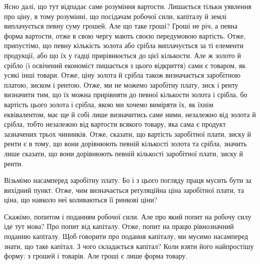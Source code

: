 Ясно далі, що тут відпадає саме розуміння вартости. Лишається тільки
уявлення про ціну, в тому розумінні, що посідачам робочої сили, капіталу
й землі виплачується певну суму грошей. Але що таке гроші? Гроші не річ,
а певна форма вартости, отже в свою чергу мають своєю передумовою вартість.
Отже, припустімо, що певну кількість золота або срібла виплачується за ті елементи
продукції, або що їх у гадці прирівнюється до цієї кількости. Але ж
золото й срібло (і освічений економіст пишається з цього відкриття) сами є
товаром, як усякі інші товари. Отже, ціну золота й срібла також визначається
заробітною платою, зиском і рентою. Отже, ми не можемо заробітну плату, зиск
і ренту визначити тим, що їх можна прирівняти до певної кількости золота
і срібла, бо вартість цього золота і срібла, якою ми хочемо виміряти їх, як їхнім
еквівалентом, має ще й собі лише визначитись саме ними, незалежно від золота
й срібла, тобто незалежно від вартости всякого товару, яка сама є продукт зазначених
трьох чинників. Отже, сказати, що вартість заробітної плати, зиску
й ренти є в тому, що вони дорівнюють певній кількості золота та срібла, значить
лише сказати, що вони дорівнюють певній кількості заробітної плати,
зиску й ренти.

Візьмімо насамперед заробітну плату. Бо і з цього погляду праця мусить
бути за вихідний пункт. Отже, чим визначається реґуляційна ціна заробітної
плати, та ціна, що навколо неї коливаються її ринкові ціни?

Скажімо, попитом і поданням робочої сили. Але про який попит на робочу
силу іде тут мова? Про попит від капіталу. Отже, попит на працю рівнозначний
поданню капіталу. Щоб говорити про подання капіталу, ми мусимо
насамперед знати, що таке капітал. З чого складається капітал? Коли взяти
його найпростішу форму: з грошей і товарів. Але гроші є лише форма товару.
\parbreak{}  %
